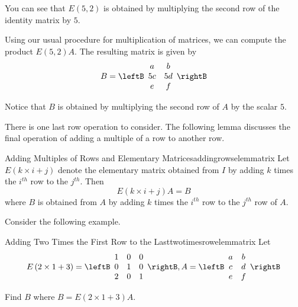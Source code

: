 \begin{solution}
You can see that $E \left(5, 2\right)$ is obtained by multiplying the second row 
of the identity matrix by $5$.

Using our usual procedure for multiplication of matrices, we can compute the product $E \left(5, 2\right)A$. The 
resulting matrix is given by 
\begin{equation*}
B
=\leftB
\begin{array}{cc}
a & b \\
5c & 5d \\
e & f
\end{array}
\rightB
\end{equation*}

Notice that $B$ is obtained by multiplying the second row of $A$ by the scalar $5$. 
\end{solution}

There is one last row operation to consider. The following lemma discusses the final
operation of adding a multiple of a row to another row.

\begin{lemma}{Adding Multiples of Rows and Elementary Matrices}{addingrowselemmatrix}
Let $E\left( k \times i+j\right) $ denote the elementary
matrix obtained from $I$ by adding $k$ times the $i^{th}$ row to the $j^{th}$. Then
\begin{equation*}
E\left( k \times i+j\right) A=B
\end{equation*}
where $B$ is obtained from $A$ by adding $k$ times the $i^{th}$ row to the $j^{th}$ row of $A.$
\end{lemma}

Consider the following example.

\begin{example}{Adding Two Times the First Row to the Last}{twotimesrowelemmatrix}
Let
\begin{equation*}
E\left( 2 \times 1+3\right) = \leftB
\begin{array}{rrr}
1 & 0 & 0 \\
0 & 1 & 0 \\
2 & 0 & 1
\end{array}
\rightB, A =  \leftB
\begin{array}{cc}
a & b \\
c & d \\
e & f
\end{array}
\rightB 
\end{equation*}

Find $B$ where $B = E\left( 2 \times 1+3\right)A$.
\end{example}

